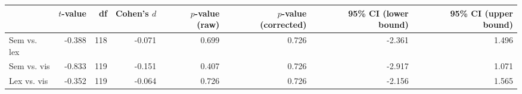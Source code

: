 \begin{tabular}{lrrrrrrr}
\toprule
{} & $t$-value &  df & Cohen's $d$ & $p$-value (raw) & $p$-value (corrected) & 95\% CI (lower bound) & 95\% CI (upper bound) \\
\midrule
Sem vs. lex &    -0.388 & 118 &      -0.071 &           0.699 &                 0.726 &                -2.361 &                 1.496 \\
Sem vs. vis &    -0.833 & 119 &      -0.151 &           0.407 &                 0.726 &                -2.917 &                 1.071 \\
Lex vs. vis &    -0.352 & 119 &      -0.064 &           0.726 &                 0.726 &                -2.156 &                 1.565 \\
\bottomrule
\end{tabular}
